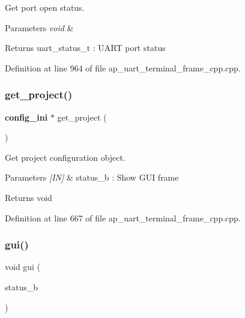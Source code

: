 Get port open status. 


\begin{DoxyParams}{Parameters}
{\em void} & \\
\hline
\end{DoxyParams}
\begin{DoxyReturn}{Returns}
uart\+\_\+status\+\_\+t \+: U\+A\+RT port status 
\end{DoxyReturn}


Definition at line 964 of file ap\+\_\+uart\+\_\+terminal\+\_\+frame\+\_\+cpp.\+cpp.

\mbox{\label{group___u_a_r_t__terminal_gadb467188cf8181ac20594cef5f000774}} 
\subsubsection{get\_project()}
{\footnotesize\ttfamily \textbf{ config\+\_\+ini} $\ast$ get\+\_\+project (\begin{DoxyParamCaption}\item[{void}]{ }\end{DoxyParamCaption})}



Get project configuration object. 


\begin{DoxyParams}{Parameters}
{\em \mbox{[}\+I\+N\mbox{]}} & status\+\_\+b \+: Show G\+UI frame \\
\hline
\end{DoxyParams}
\begin{DoxyReturn}{Returns}
void 
\end{DoxyReturn}


Definition at line 667 of file ap\+\_\+uart\+\_\+terminal\+\_\+frame\+\_\+cpp.\+cpp.

\mbox{\label{group___u_a_r_t__terminal_ga1986b0e4e7fba4b4af869473513e1ce9}} 
\subsubsection{gui()}
{\footnotesize\ttfamily void gui (\begin{DoxyParamCaption}\item[{bool}]{status\+\_\+b }\end{DoxyParamCaption})}



